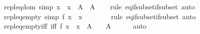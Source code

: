 \begin{isabellebody}
\endisatagproof
{\isafoldproof}%
%
\isadelimproof
\isanewline
%
\endisadelimproof
\isanewline
{}\isamarkupfalse%
\ repl{\isacharunderscore}{\kern0pt}eq{\isacharunderscore}{\kern0pt}dom\ {\isacharbrackleft}{\kern0pt}simp{\isacharbrackright}{\kern0pt}{\isacharcolon}{\kern0pt}\ {\isachardoublequoteopen}{\isacharbraceleft}{\kern0pt}x\ {\isacharbar}{\kern0pt}\ x\ {\isasymin}\ A{\isacharbraceright}{\kern0pt}\ {\isacharequal}{\kern0pt}\ A{\isachardoublequoteclose}\isanewline
%
\isadelimproof
\ \ %
\endisadelimproof
%
\isatagproof
{}\isamarkupfalse%
\ {\isacharparenleft}{\kern0pt}rule\ eq{\isacharunderscore}{\kern0pt}if{\isacharunderscore}{\kern0pt}subset{\isacharunderscore}{\kern0pt}if{\isacharunderscore}{\kern0pt}subset{\isacharparenright}{\kern0pt}\ auto%
\endisatagproof
{\isafoldproof}%
%
\isadelimproof
\isanewline
%
\endisadelimproof
\isanewline
{}\isamarkupfalse%
\ repl{\isacharunderscore}{\kern0pt}eq{\isacharunderscore}{\kern0pt}empty\ {\isacharbrackleft}{\kern0pt}simp{\isacharbrackright}{\kern0pt}{\isacharcolon}{\kern0pt}\ {\isachardoublequoteopen}{\isacharbraceleft}{\kern0pt}f\ x\ {\isacharbar}{\kern0pt}\ x\ {\isasymin}\ {\isacharbraceleft}{\kern0pt}{\isacharbraceright}{\kern0pt}{\isacharbraceright}{\kern0pt}\ {\isacharequal}{\kern0pt}\ {\isacharbraceleft}{\kern0pt}{\isacharbraceright}{\kern0pt}{\isachardoublequoteclose}\isanewline
%
\isadelimproof
\ \ %
\endisadelimproof
%
\isatagproof
{}\isamarkupfalse%
\ {\isacharparenleft}{\kern0pt}rule\ eq{\isacharunderscore}{\kern0pt}if{\isacharunderscore}{\kern0pt}subset{\isacharunderscore}{\kern0pt}if{\isacharunderscore}{\kern0pt}subset{\isacharparenright}{\kern0pt}\ auto%
\endisatagproof
{\isafoldproof}%
%
\isadelimproof
\isanewline
%
\endisadelimproof
\isanewline
{}\isamarkupfalse%
\ repl{\isacharunderscore}{\kern0pt}eq{\isacharunderscore}{\kern0pt}empty{\isacharunderscore}{\kern0pt}iff\ {\isacharbrackleft}{\kern0pt}iff{\isacharbrackright}{\kern0pt}{\isacharcolon}{\kern0pt}\ {\isachardoublequoteopen}{\isacharbraceleft}{\kern0pt}f\ x\ {\isacharbar}{\kern0pt}\ x\ {\isasymin}\ A{\isacharbraceright}{\kern0pt}\ {\isacharequal}{\kern0pt}\ {\isacharbraceleft}{\kern0pt}{\isacharbraceright}{\kern0pt}\ {\isasymlongleftrightarrow}\ A\ {\isacharequal}{\kern0pt}\ {\isacharbraceleft}{\kern0pt}{\isacharbraceright}{\kern0pt}{\isachardoublequoteclose}\isanewline
%
\isadelimproof
\ \ %
\endisadelimproof
%
\isatagproof
{}\isamarkupfalse%
\ auto%
\endisatagproof
{\isafoldproof}%
%
\isadelimproof
\isanewline
%
\endisadelimproof
\isanewline
{}\isamarkupfalse%

\end{isabellebody}
